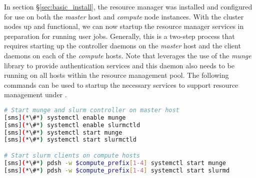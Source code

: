In section \S\ref{sec:basic_install}, the \SLURM{} resource manager was installed
and configured for use on both the {\em master} host and {\em compute} node
instances. With the cluster nodes up and functional, we can now startup the
resource manager services in preparation for running user jobs. Generally, this
is a two-step process that requires starting up the controller daemons on the {\em
 master} host and the client daemons on each of the {\em compute} hosts.
Note that \SLURM{} leverages the use of the {\em munge} library to provide
authentication services and this daemon also needs to be running on all hosts
within the resource management pool. 
The following commands can be used to startup the necessary services to support
resource management under \SLURM{}.





\begin{lstlisting}[language=bash,keywords={}]
# Start munge and slurm controller on master host
[sms](*\#*) systemctl enable munge
[sms](*\#*) systemctl enable slurmctld
[sms](*\#*) systemctl start munge
[sms](*\#*) systemctl start slurmctld

# Start slurm clients on compute hosts
[sms](*\#*) pdsh -w $compute_prefix[1-4] systemctl start munge
[sms](*\#*) pdsh -w $compute_prefix[1-4] systemctl start slurmd
\end{lstlisting}



